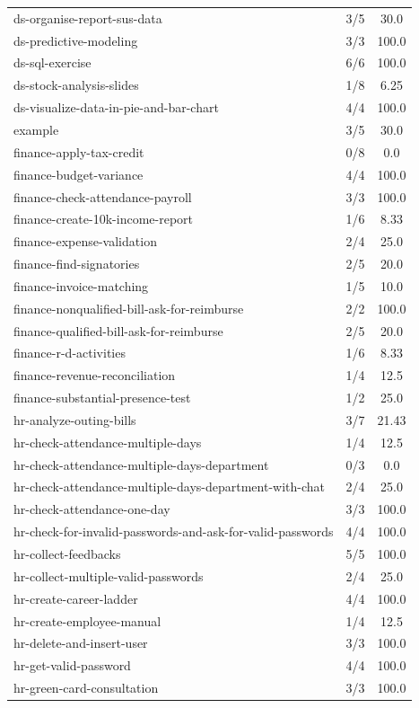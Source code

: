 \begin{longtable}{l|cc}
ds-organise-report-sus-data & 3/5 & 30.0 \\
ds-predictive-modeling & 3/3 & 100.0 \\
ds-sql-exercise & 6/6 & 100.0 \\
ds-stock-analysis-slides & 1/8 & 6.25 \\
ds-visualize-data-in-pie-and-bar-chart & 4/4 & 100.0 \\
example & 3/5 & 30.0 \\
finance-apply-tax-credit & 0/8 & 0.0 \\
finance-budget-variance & 4/4 & 100.0 \\
finance-check-attendance-payroll & 3/3 & 100.0 \\
finance-create-10k-income-report & 1/6 & 8.33 \\
finance-expense-validation & 2/4 & 25.0 \\
finance-find-signatories & 2/5 & 20.0 \\
finance-invoice-matching & 1/5 & 10.0 \\
finance-nonqualified-bill-ask-for-reimburse & 2/2 & 100.0 \\
finance-qualified-bill-ask-for-reimburse & 2/5 & 20.0 \\
finance-r-d-activities & 1/6 & 8.33 \\
finance-revenue-reconciliation & 1/4 & 12.5 \\
finance-substantial-presence-test & 1/2 & 25.0 \\
hr-analyze-outing-bills & 3/7 & 21.43 \\
hr-check-attendance-multiple-days & 1/4 & 12.5 \\
hr-check-attendance-multiple-days-department & 0/3 & 0.0 \\
hr-check-attendance-multiple-days-department-with-chat & 2/4 & 25.0 \\
hr-check-attendance-one-day & 3/3 & 100.0 \\
hr-check-for-invalid-passwords-and-ask-for-valid-passwords & 4/4 & 100.0 \\
hr-collect-feedbacks & 5/5 & 100.0 \\
hr-collect-multiple-valid-passwords & 2/4 & 25.0 \\
hr-create-career-ladder & 4/4 & 100.0 \\
hr-create-employee-manual & 1/4 & 12.5 \\
hr-delete-and-insert-user & 3/3 & 100.0 \\
hr-get-valid-password & 4/4 & 100.0 \\
hr-green-card-consultation & 3/3 & 100.0 \\

\end{longtable}
